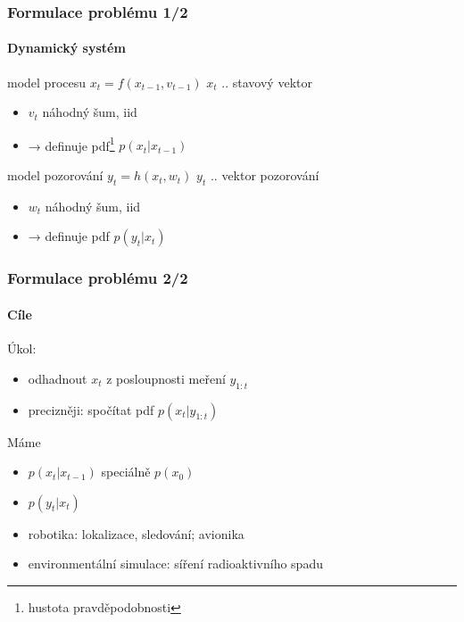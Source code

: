 \documentclass[12pt]{beamer}
\begin{document}
\begin{frame}
	\frametitle{Formulace problému 1/2}
	\framesubtitle{Dynamický systém}

	\begin{block}{model procesu}
		\(x_t = f(x_{t-1}, v_{t-1})\) \hspace{3cm} \(x_t\) .. stavový vektor

		\begin{itemize}
		\item \(v_t\) náhodný šum, iid
		\item → definuje pdf\footnote{hustota pravděpodobnosti} \(p(x_t|x_{t-1})\)
		\end{itemize}
	\end{block}

	\begin{block}{model pozorování}
		\(y_t = h(x_t, w_t)\) \hspace{3cm} \(y_t\) .. vektor pozorování

		\begin{itemize}
		\item \(w_t\) náhodný šum, iid
		\item → definuje pdf \(p(y_t|x_t)\)
		\end{itemize}
	\end{block}
\end{frame}

\begin{frame}
	\frametitle{Formulace problému 2/2}
	\framesubtitle{Cíle}

	{\large Úkol:
	\begin{itemize}
		\item odhadnout \(x_t\) z posloupnosti meření \(y_{1:t}\)
		\item precizněji: spočítat pdf \(p(x_t | y_{1:t})\)
	\end{itemize}
	}

	\begin{block}{Máme}
		\begin{itemize}
			\item \(p(x_t|x_{t-1})\) \hspace{1cm} speciálně \(p(x_0)\)
			\item \(p(y_t|x_t)\)
		\end{itemize}
	\end{block}

	\begin{example}
		\begin{itemize}
			\item robotika: lokalizace, sledování; avionika
			\item environmentální simulace: síření radioaktivního spadu
		\end{itemize}
	\end{example}
\end{frame}
\end{document}
